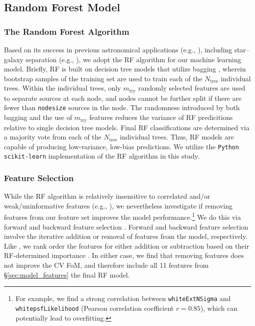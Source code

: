 \documentclass[twocolumn, dvipdfmx]{aastex62}
\begin{document}
\subsection{Random Forest Model}\label{sec:rf_model}

\subsubsection{The Random Forest Algorithm}\label{sec:rf_alg}

Based on its success in previous astronomical applications (e.g., \citealt{Richards12a, Huppenkothen17, Brink13, Wright15, Goldstein15}), including
star--galaxy separation (e.g., \citealt{Vasconcellos11,Miller17}), we adopt
the RF algorithm \citep{Breiman01} for our machine learning model. Briefly,
RF is built on decision tree models \citep{Quinlan93} that utilize bagging
\citep{Breiman96}, wherein bootstrap samples of the training set are used to
train each of the $N_{\mathrm{tree}}$ individual trees. Within the
individual trees, only $m_{\mathrm{try}}$ randomly selected features are
used to separate sources at each node, and nodes cannot be further split if
there are fewer than \texttt{nodesize} sources in the node. The randomness
introduced by both bagging and the use of $m_{\mathrm{try}}$ features
reduces the variance of RF predicitions relative to single decision tree
models. Final RF classifications are determined via a majority vote from
each of the $N_{\mathrm{tree}}$ individual trees. Thus, RF models are
capable of producing low-variance, low-bias predictions. We utilize the
\texttt{Python scikit-learn} implementation of the RF algorithm
\citep{Pedregosa12} in this study.

\subsubsection{Feature Selection}

While the RF algorithm is relatively insensitive to correlated and/or
weak/uninformative features (e.g., \citealt{Richards12a}), we nevertheless
investigate if removing features from our feature set improves the model
performance.\footnote{For example, we find a strong correlation between
\texttt{whiteExtNSigma} and \texttt{whitepsfLikelihood} (Pearson correlation
coefficient $r = 0.85$), which can potentially lead to overfitting.} We do
this via forward and backward feature selection \citep{Guyon03}. Forward and
backward feature selection involve the iterative addition or removal of
features from the model, respectively. Like \citet{Richards12a}, we rank
order the features for either addition or subtraction based on their
RF-determined importance \citep{Breiman02}. In either case, we find that
removing features does not improve the CV FoM, and therefore include all 11
features from \S\ref{sec:model_features} the final RF model.
\end{document}
